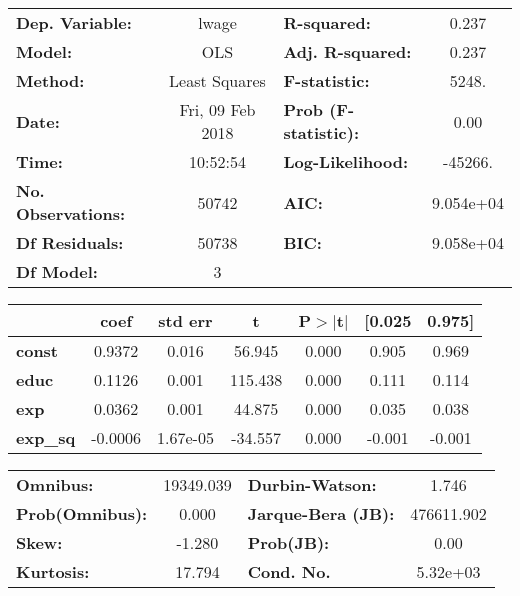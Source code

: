 \begin{center}
\begin{tabular}{lclc}
\toprule
\textbf{Dep. Variable:}    &      lwage       & \textbf{  R-squared:         } &     0.237   \\
\textbf{Model:}            &       OLS        & \textbf{  Adj. R-squared:    } &     0.237   \\
\textbf{Method:}           &  Least Squares   & \textbf{  F-statistic:       } &     5248.   \\
\textbf{Date:}             & Fri, 09 Feb 2018 & \textbf{  Prob (F-statistic):} &     0.00    \\
\textbf{Time:}             &     10:52:54     & \textbf{  Log-Likelihood:    } &   -45266.   \\
\textbf{No. Observations:} &       50742      & \textbf{  AIC:               } & 9.054e+04   \\
\textbf{Df Residuals:}     &       50738      & \textbf{  BIC:               } & 9.058e+04   \\
\textbf{Df Model:}         &           3      & \textbf{                     } &             \\
\bottomrule
\end{tabular}
\begin{tabular}{lcccccc}
                 & \textbf{coef} & \textbf{std err} & \textbf{t} & \textbf{P$>$$|$t$|$} & \textbf{[0.025} & \textbf{0.975]}  \\
\midrule
\textbf{const}   &       0.9372  &        0.016     &    56.945  &         0.000        &        0.905    &        0.969     \\
\textbf{educ}    &       0.1126  &        0.001     &   115.438  &         0.000        &        0.111    &        0.114     \\
\textbf{exp}     &       0.0362  &        0.001     &    44.875  &         0.000        &        0.035    &        0.038     \\
\textbf{exp\_sq} &      -0.0006  &     1.67e-05     &   -34.557  &         0.000        &       -0.001    &       -0.001     \\
\bottomrule
\end{tabular}
\begin{tabular}{lclc}
\textbf{Omnibus:}       & 19349.039 & \textbf{  Durbin-Watson:     } &     1.746   \\
\textbf{Prob(Omnibus):} &    0.000  & \textbf{  Jarque-Bera (JB):  } & 476611.902  \\
\textbf{Skew:}          &   -1.280  & \textbf{  Prob(JB):          } &      0.00   \\
\textbf{Kurtosis:}      &   17.794  & \textbf{  Cond. No.          } &  5.32e+03   \\
\bottomrule
\end{tabular}
\end{center}